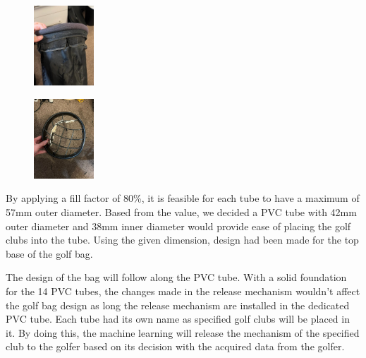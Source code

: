 \documentclass[11pt,landscape]{article}
\begin{document}
\begin{multicols}{3}
    \begin{figure}[H]
        \begin{center}
            \includegraphics[width=0.2\textwidth]{Figure3.jpg}
            \label{fig:cloth}
        \end{center}
    \end{figure}
    
    \begin{figure}[H]
        \begin{center}
            \includegraphics[width=0.2\textwidth]{Figure2.jpg}
            \label{fig:top}
        \end{center}
    \end{figure}
    
    
    
    By applying a fill factor of 80\%, it is feasible for each tube to have a
    maximum of 57mm outer diameter. Based from the value, we decided a PVC tube
    with 42mm outer diameter and 38mm inner diameter would provide ease of
    placing the golf clubs into the tube. Using the given dimension, design had
    been made for the top base of the golf bag.
    
    The design of the bag will follow along the PVC tube. With a solid
    foundation for the 14 PVC tubes, the changes made in the release mechanism
    wouldn’t affect the golf bag design as long the release mechanism are
    installed in the dedicated PVC tube. Each tube had its own name as specified
    golf clubs will be placed in it. By doing this, the machine learning will
    release the mechanism of the specified club to the golfer based on its
    decision with the acquired data from the golfer. 
    

\end{multicols}
\end{document}
